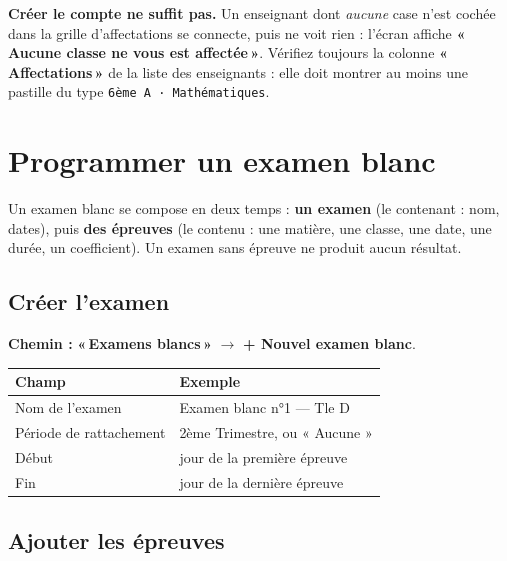 \documentclass[11pt,a4paper]{article}
\newcommand{\menu}[1]{\textbf{«\,#1\,»}}
\newcommand{\bouton}[1]{\textbf{#1}}
\begin{document}
\begin{boiteerreur}
\textbf{Créer le compte ne suffit pas.} Un enseignant dont \emph{aucune} case n'est
cochée dans la grille d'affectations se connecte, puis ne voit rien : l'écran
affiche \menu{Aucune classe ne vous est affectée}. Vérifiez toujours la colonne
\menu{Affectations} de la liste des enseignants : elle doit montrer au moins une
pastille du type \texttt{6ème A · Mathématiques}.
\end{boiteerreur}

\newpage

\section{Programmer un examen blanc}

Un examen blanc se compose en deux temps : \textbf{un examen} (le contenant :
nom, dates), puis \textbf{des épreuves} (le contenu : une matière, une classe, une
date, une durée, un coefficient). Un examen sans épreuve ne produit aucun
résultat.

\subsection{Créer l'examen}

\textbf{Chemin :} \menu{Examens blancs} $\rightarrow$ \bouton{+ Nouvel examen blanc}.

\begin{center}
\renewcommand{\arraystretch}{1.25}
\begin{tabularx}{\textwidth}{@{} >{\raggedright}p{4.4cm} X@{}}
\toprule
\textbf{Champ} & \textbf{Exemple} \\
\midrule
Nom de l'examen & Examen blanc n°1 — Tle D \\
Période de rattachement & 2ème Trimestre, ou « Aucune » \\
Début & jour de la première épreuve \\
Fin & jour de la dernière épreuve \\
\bottomrule
\end{tabularx}
\end{center}

\subsection{Ajouter les épreuves}
\end{document}
